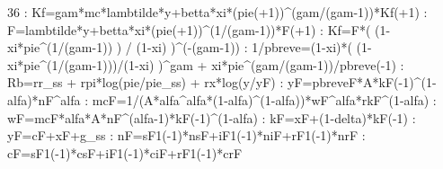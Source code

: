 \documentclass{article}%
\begin{document}
36   :  Kf=gam*mc*lambtilde*y+betta*xi*(pie(+1))\^{}(gam/(gam{-}1))*Kf(+1)\newline%
   :  F=lambtilde*y+betta*xi*(pie(+1))\^{}(1/(gam{-}1))*F(+1)\newline%
   :  Kf=F*( (1{-}xi*pie\^{}(1/(gam{-}1)) ) / (1{-}xi) )\^{}({-}(gam{-}1))\newline%
   :  1/pbreve=(1{-}xi)*( (1{-}xi*pie\^{}(1/(gam{-}1)))/(1{-}xi) )\^{}gam + xi*pie\^{}(gam/(gam{-}1))/pbreve({-}1)\newline%
   :  Rb=rr\_ss + rpi*log(pie/pie\_ss) + rx*log(y/yF)\newline%
   :  yF=pbreveF*A*kF({-}1)\^{}(1{-}alfa)*nF\^{}alfa\newline%
   :  mcF=1/(A*alfa\^{}alfa*(1{-}alfa)\^{}(1{-}alfa))*wF\^{}alfa*rkF\^{}(1{-}alfa)\newline%
   :  wF=mcF*alfa*A*nF\^{}(alfa{-}1)*kF({-}1)\^{}(1{-}alfa)\newline%
   :  kF=xF+(1{-}delta)*kF({-}1)\newline%
   :  yF=cF+xF+g\_ss\newline%
   :  nF=sF1({-}1)*nsF+iF1({-}1)*niF+rF1({-}1)*nrF\newline%
   :  cF=sF1({-}1)*csF+iF1({-}1)*ciF+rF1({-}1)*crF\newline%
\newline%
\end{document}
